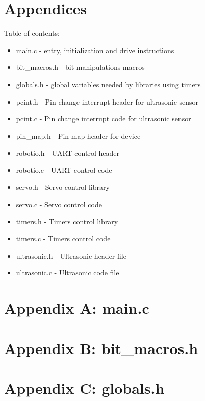 \documentclass[letterpaper,11pt]{texMemo} %
\begin{document}
\section*{Appendices}
Table of contents:
\begin{itemize}
    \item main.c - entry, initialization and drive instructions
    \item bit\_macros.h - bit manipulations macros
    \item globals.h - global variables needed by libraries using timers
    \item pcint.h - Pin change interrupt header for ultrasonic sensor
    \item pcint.c - Pin change interrupt code for ultrasonic sensor
    \item pin\_map.h - Pin map header for device
    \item robotio.h - UART control header
    \item robotio.c - UART control code
    \item servo.h - Servo control library
    \item servo.c - Servo control code
    \item timers.h - Timers control library
    \item timers.c - Timers control code
    \item ultrasonic.h - Ultrasonic header file
    \item ultrasonic.c - Ultrasonic code file
\end{itemize}
\newpage

\section*{Appendix A: main.c}
\begin{tiny}

\end{tiny}
\newpage

\section*{Appendix B: bit\_macros.h}
\begin{tiny}

\end{tiny}
\newpage

\section*{Appendix C: globals.h}
\begin{tiny}

\end{tiny}
\newpage
\end{document}
